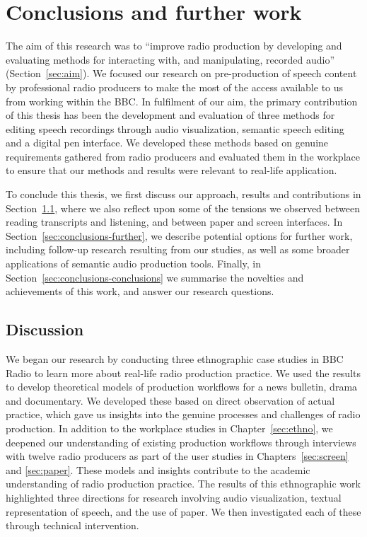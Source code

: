\chapter{Conclusions and further work}\label{sec:conclusions}

The aim of this research was to ``improve radio production by developing and evaluating methods for interacting with,
and manipulating, recorded audio'' (Section~\ref{sec:aim}).  We focused our research on pre-production of speech
content by professional radio producers to make the most of the access available to us from working within the BBC.  In
fulfilment of our aim, the primary contribution of this thesis has been the development and evaluation of three methods
for editing speech recordings through audio visualization, semantic speech editing and a digital pen interface.  We
developed these methods based on genuine requirements gathered from radio producers and evaluated them in the workplace
to ensure that our methods and results were relevant to real-life application.

To conclude this thesis, we first discuss our approach, results and contributions in
Section~\ref{sec:conclusions-discussion}, where we also reflect upon some of the tensions we observed between reading
transcripts and listening, and between paper and screen interfaces.  In Section~\ref{sec:conclusions-further}, we
describe potential options for further work, including follow-up research resulting from our studies, as well as some
broader applications of semantic audio production tools.  Finally, in Section~\ref{sec:conclusions-conclusions} we
summarise the novelties and achievements of this work, and answer our research questions.

\section{Discussion}\label{sec:conclusions-discussion}

We began our research by conducting three ethnographic case studies in BBC Radio to learn more about real-life
radio production practice.  We used the results to develop theoretical models of production workflows for a news
bulletin, drama and documentary.  We developed these based on direct observation of actual practice, which gave us 
insights into the genuine processes and challenges of radio production.  In addition to the workplace studies in
Chapter~\ref{sec:ethno}, we deepened our understanding of existing production workflows through interviews with twelve
radio producers as part of the user studies in Chapters~\ref{sec:screen} and \ref{sec:paper}.  These models and
insights contribute to the academic understanding of radio production practice.  The results of this ethnographic work
highlighted three directions for research involving audio visualization, textual representation of speech, and the use
of paper.  We then investigated each of these through technical intervention.


